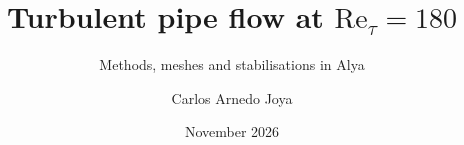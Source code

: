 \documentclass[aspectratio=169,11pt]{beamer}
\title{Turbulent pipe flow at $\mathrm{Re}_\tau = 180$}
\subtitle{Methods, meshes and stabilisations in Alya}
\author{Carlos Arnedo Joya}
\institute{Barcelona Supercomputing Center}
\date{November 2026}
\begin{document}
\begin{frame}[plain]\titlepage\end{frame}
\end{document}
